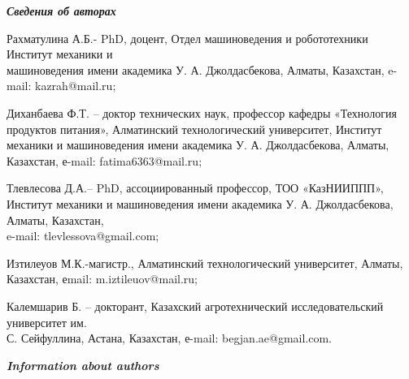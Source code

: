 \emph{{\bfseries Сведения об авторах}}

\begin{noparindent}

Рахматулина А.Б.- PhD, доцент, Отдел машиноведения и робототехники
Институт механики и \\машиноведения имени академика У. А. Джолдасбекова,
Алматы, Казахстан, e-mail: kazrah@mail.ru;

Диханбаева Ф.Т. -- доктор технических наук, профессор кафедры
«Технология продуктов питания», Алматинский технологический университет,
Институт механики и машиноведения имени академика У. А. Джолдасбекова,
Алматы, Казахстан, е-mail: fatima6363@mail.ru;

Тлевлесова Д.А.-- PhD, ассоциированный профессор, ТОО «КазНИИППП»,
Институт механики и машиноведения имени академика У. А. Джолдасбекова,
Алматы, Казахстан, \\e-mail: tlevlessova@gmail.com;

Изтилеуов М.К.-магистр., Алматинский технологический университет,
Алматы, Казахстан, еmail: m.iztileuov@mail.ru;

Калемшарив Б. -- докторант, Казахский агротехнический исследовательский
университет им. \\С. Сейфуллина, Астана, Казахстан, е-mail:
begjan.ae@gmail.com.

\end{noparindent}

\emph{{\bfseries Information about authors}}

